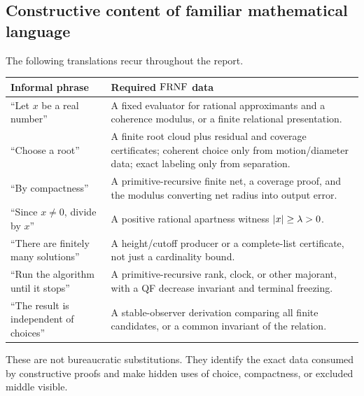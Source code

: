 \subsection{Constructive content of familiar mathematical language}

The following translations recur throughout the report.

\begin{center}
\begin{tabularx}{\textwidth}{@{}p{}X@{}}
\toprule
Informal phrase & Required \(\mathrm{FRNF}\) data \\
\midrule
``Let \(x\) be a real number'' & A fixed evaluator for rational approximants and a
coherence modulus, or a finite relational presentation. \\
``Choose a root'' & A finite root cloud plus residual and coverage certificates;
coherent choice only from motion/diameter data; exact labeling only from separation. \\
``By compactness'' & A primitive-recursive finite net, a coverage proof, and the
modulus converting net radius into output error. \\
``Since \(x\ne0\), divide by \(x\)'' & A positive rational apartness witness
\(\lvert x\rvert\ge\lambda>0\). \\
``There are finitely many solutions'' & A height/cutoff producer or a complete-list
certificate, not just a cardinality bound. \\
``Run the algorithm until it stops'' & A primitive-recursive rank, clock, or other
majorant, with a QF decrease invariant and terminal freezing. \\
``The result is independent of choices'' & A stable-observer derivation comparing all
finite candidates, or a common invariant of the relation. \\
\bottomrule
\end{tabularx}
\end{center}

These are not bureaucratic substitutions.  They identify the exact data consumed by
constructive proofs and make hidden uses of choice, compactness, or excluded middle
visible.
